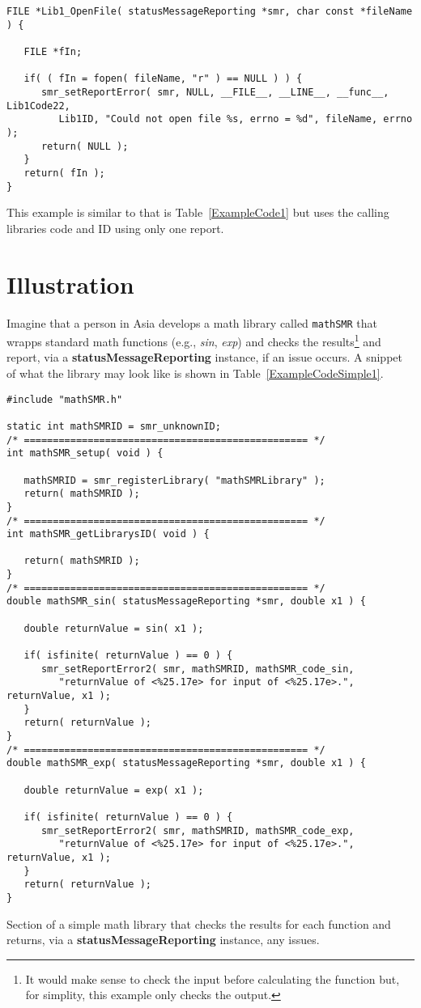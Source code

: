 \documentclass[11pt]{article}
\begin{document}
\begin{table}
\begin{verbatim}
FILE *Lib1_OpenFile( statusMessageReporting *smr, char const *fileName ) {

   FILE *fIn;

   if( ( fIn = fopen( fileName, "r" ) == NULL ) ) {
      smr_setReportError( smr, NULL, __FILE__, __LINE__, __func__, Lib1Code22,
         Lib1ID, "Could not open file %s, errno = %d", fileName, errno );
      return( NULL );
   }
   return( fIn );
}
\end{verbatim}
\caption{This example is similar to that is Table~\ref{ExampleCode1} but uses the calling libraries
	code and ID using only one report.} \label{ExampleCode1p1}
\end{table}

\section{Illustration}
Imagine that a person in Asia develops a math library called \texttt{mathSMR} that wrapps standard 
math functions (e.g., \textit{sin}, \textit{exp}) and checks the 
results\footnote{It would make sense to check the input before calculating the function
but, for simplity, this example only checks the output.} and report, via a
\textbf{statusMessageReporting} instance, if an issue occurs. A snippet of what the library
may look like is shown in Table~\ref{ExampleCodeSimple1}.

\begin{table}
\begin{verbatim}
#include "mathSMR.h"

static int mathSMRID = smr_unknownID;
/* ================================================= */
int mathSMR_setup( void ) {

   mathSMRID = smr_registerLibrary( "mathSMRLibrary" );
   return( mathSMRID );
}
/* ================================================= */
int mathSMR_getLibrarysID( void ) {

   return( mathSMRID );
}
/* ================================================= */
double mathSMR_sin( statusMessageReporting *smr, double x1 ) {

   double returnValue = sin( x1 );

   if( isfinite( returnValue ) == 0 ) {
      smr_setReportError2( smr, mathSMRID, mathSMR_code_sin, 
         "returnValue of <%25.17e> for input of <%25.17e>.", returnValue, x1 );
   }
   return( returnValue );
}
/* ================================================= */
double mathSMR_exp( statusMessageReporting *smr, double x1 ) {

   double returnValue = exp( x1 );

   if( isfinite( returnValue ) == 0 ) {
      smr_setReportError2( smr, mathSMRID, mathSMR_code_exp, 
         "returnValue of <%25.17e> for input of <%25.17e>.", returnValue, x1 );
   }
   return( returnValue );
}
\end{verbatim}
\caption{Section of a simple math library that checks the results for each function and returns, via a
    \textbf{statusMessageReporting} instance, any issues.} \label{ExampleCodeSimple1}
\end{table}
\end{document}
